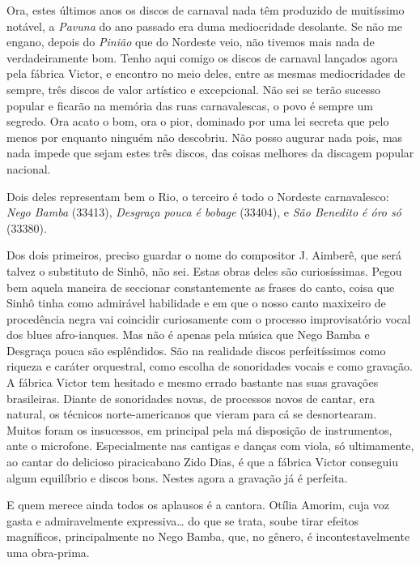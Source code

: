 Ora, estes últimos anos os discos de carnaval nada têm produzido de
muitíssimo notável, a \textit{Pavuna} do ano passado era duma mediocridade
desolante. Se não me engano, depois do \textit{Pinião} que do Nordeste
veio, não tivemos mais nada de verdadeiramente bom. Tenho aqui comigo os
discos de carnaval lançados agora pela fábrica Victor, e encontro no
meio deles, entre as mesmas mediocridades de sempre, três discos de
valor artístico e excepcional. Não sei se terão sucesso popular e
ficarão na memória das ruas carnavalescas, o povo é sempre um segredo.
Ora acato o bom, ora o pior, dominado por uma lei secreta que pelo menos
por enquanto ninguém não descobriu. Não posso augurar nada pois, mas
nada impede que sejam estes três discos, das coisas melhores da discagem
popular nacional.

Dois deles representam bem o Rio, o terceiro é todo o Nordeste
carnavalesco: \textit{Nego Bamba} (33413), \textit{Desgraça pouca é bobage}
(33404), e \textit{São Benedito é óro só} (33380).

Dos dois primeiros, preciso guardar o nome do compositor J. Aimberê, que
será talvez o substituto de Sinhô, não sei. Estas obras deles são
curiosíssimas. Pegou bem aquela maneira de seccionar constantemente as
frases do canto, coisa que Sinhô tinha como admirável habilidade e em
que o nosso canto maxixeiro de procedência negra vai coincidir
curiosamente com o processo improvisatório vocal dos blues afro-ianques.
Mas não é apenas pela música que Nego Bamba e Desgraça pouca são
esplêndidos. São na realidade discos perfeitíssimos como riqueza e
caráter orquestral, como escolha de sonoridades vocais e como gravação.
A fábrica Victor tem hesitado e mesmo errado bastante nas suas gravações
brasileiras. Diante de sonoridades novas, de processos novos de cantar,
era natural, os técnicos norte-americanos que vieram para cá se
desnortearam. Muitos foram os insucessos, em principal pela má
disposição de instrumentos, ante o microfone. Especialmente nas cantigas
e danças com viola, só ultimamente, ao cantar do delicioso piracicabano
Zido Dias, é que a fábrica Victor conseguiu algum equilíbrio e discos
bons. Nestes agora a gravação já é perfeita.

E quem merece ainda todos os aplausos é a cantora. Otília Amorim, cuja
voz gasta e admiravelmente expressiva\ldots{} do que se trata, soube tirar
efeitos magníficos, principalmente no Nego Bamba, que, no gênero, é
incontestavelmente uma obra-prima.


